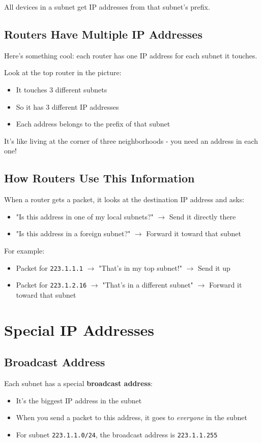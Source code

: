 \documentclass[../../compsys.tex]{subfiles}
\begin{document}
All devices in a subnet get IP addresses from that subnet's prefix.

\subsection{Routers Have Multiple IP Addresses}
Here's something cool: each router has one IP address for each subnet it touches.

Look at the top router in the picture:
\begin{itemize}
    \item It touches 3 different subnets
    \item So it has 3 different IP addresses
    \item Each address belongs to the prefix of that subnet
\end{itemize}

It's like living at the corner of three neighborhoods - you need an address in each one!

\subsection{How Routers Use This Information}
When a router gets a packet, it looks at the destination IP address and asks:
\begin{itemize}
    \item "Is this address in one of my local subnets?" $\rightarrow$ Send it directly there
    \item "Is this address in a foreign subnet?" $\rightarrow$ Forward it toward that subnet
\end{itemize}

For example:
\begin{itemize}
    \item Packet for \texttt{223.1.1.1} $\rightarrow$ "That's in my top subnet!" $\rightarrow$ Send it up
    \item Packet for \texttt{223.1.2.16} $\rightarrow$ "That's in a different subnet" $\rightarrow$ Forward it toward that subnet
\end{itemize}

\section{Special IP Addresses}
\subsection{Broadcast Address}
Each subnet has a special \textbf{broadcast address}:
\begin{itemize}
    \item It's the biggest IP address in the subnet
    \item When you send a packet to this address, it goes to \textit{everyone} in the subnet
    \item For subnet \texttt{223.1.1.0/24}, the broadcast address is \texttt{223.1.1.255}
\end{itemize}
\end{document}
